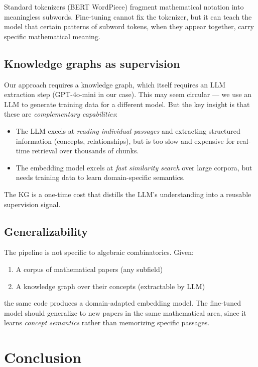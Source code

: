 \documentclass[11pt,a4paper]{article}
\begin{document}
Standard tokenizers (BERT WordPiece) fragment mathematical notation into
meaningless subwords. Fine-tuning cannot fix the tokenizer, but it can teach
the model that certain patterns of subword tokens, when they appear together,
carry specific mathematical meaning.

\subsection{Knowledge graphs as supervision}

Our approach requires a knowledge graph, which itself requires an LLM
extraction step (GPT-4o-mini in our case). This may seem circular --- we use
an LLM to generate training data for a different model. But the key insight is
that these are \emph{complementary capabilities}:
\begin{itemize}[nosep]
    \item The LLM excels at \emph{reading individual passages} and extracting
          structured information (concepts, relationships), but is too slow
          and expensive for real-time retrieval over thousands of chunks.
    \item The embedding model excels at \emph{fast similarity search} over
          large corpora, but needs training data to learn domain-specific
          semantics.
\end{itemize}

The KG is a one-time cost that distills the LLM's understanding into a
reusable supervision signal.

\subsection{Generalizability}

The pipeline is not specific to algebraic combinatorics. Given:
\begin{enumerate}[nosep]
    \item A corpus of mathematical papers (any subfield)
    \item A knowledge graph over their concepts (extractable by LLM)
\end{enumerate}
the same code produces a domain-adapted embedding model. The fine-tuned model
should generalize to new papers in the same mathematical area, since it learns
\emph{concept semantics} rather than memorizing specific passages.


\section{Conclusion}
\end{document}
